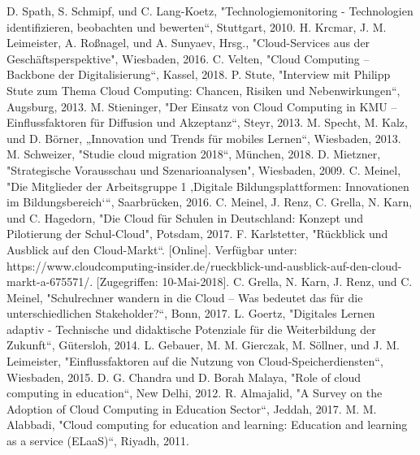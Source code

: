\documentclass[conference]{IEEEtran}
\begin{document}
\begin{thebibliography}{00}
D. Spath, S. Schmipf, und C. Lang-Koetz, "Technologiemonitoring - Technologien identifizieren, beobachten und bewerten“, Stuttgart, 2010.
 H. Krcmar, J. M. Leimeister, A. Roßnagel, und A. Sunyaev, Hrsg., "Cloud-Services aus der Geschäftsperspektive", Wiesbaden, 2016.
 C. Velten, "Cloud Computing – Backbone der Digitalisierung“, Kassel, 2018.
 P. Stute, "Interview mit Philipp Stute zum Thema Cloud Computing: Chancen, Risiken und Nebenwirkungen“, Augsburg, 2013.
 M. Stieninger, "Der Einsatz von Cloud Computing in KMU – Einflussfaktoren für Diffusion und Akzeptanz“, Steyr, 2013.
 M. Specht, M. Kalz, und D. Börner, „Innovation und Trends für mobiles Lernen“, Wiesbaden, 2013.
 M. Schweizer, "Studie cloud migration 2018“, München, 2018.
 D. Mietzner, "Strategische Vorausschau und Szenarioanalysen", Wiesbaden, 2009.
 C. Meinel, "Die Mitglieder der Arbeitsgruppe 1 ‚Digitale Bildungsplattformen: Innovationen im Bildungsbereich‘“, Saarbrücken, 2016.
 C. Meinel, J. Renz, C. Grella, N. Karn, und C. Hagedorn, "Die Cloud für Schulen in Deutschland: Konzept und Pilotierung der Schul-Cloud", Potsdam, 2017.
 F. Karlstetter, "Rückblick und Ausblick auf den Cloud-Markt“. [Online]. Verfügbar unter: https://www.cloudcomputing-insider.de/rueckblick-und-ausblick-auf-den-cloud-markt-a-675571/. [Zugegriffen: 10-Mai-2018].
 C. Grella, N. Karn, J. Renz, und C. Meinel, "Schulrechner wandern in die Cloud – Was bedeutet das für die unterschiedlichen Stakeholder?“, Bonn, 2017.
 L. Goertz, "Digitales Lernen adaptiv - Technische und didaktische Potenziale für die Weiterbildung der Zukunft“, Gütersloh, 2014.
 L. Gebauer, M. M. Gierczak, M. Söllner, und J. M. Leimeister, "Einflussfaktoren auf die Nutzung von Cloud-Speicherdiensten“, Wiesbaden, 2015.
 D. G. Chandra und D. Borah Malaya, "Role of cloud computing in education“, New Delhi, 2012.
 R. Almajalid, "A Survey on the Adoption of Cloud Computing in Education Sector“, Jeddah, 2017.
 M. M. Alabbadi, "Cloud computing for education and learning: Education and learning as a service (ELaaS)“, Riyadh, 2011.

\end{thebibliography}
\end{document}
